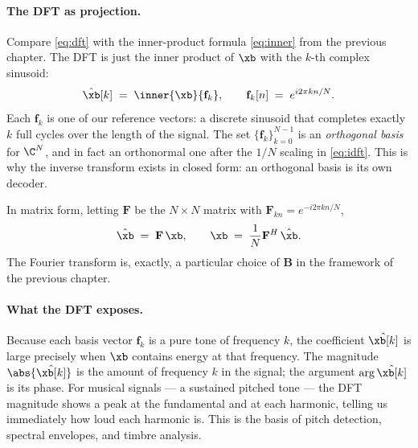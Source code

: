 
\paragraph{The DFT as projection.}  Compare \eqref{eq:dft} with the
inner-product formula \eqref{eq:inner} from the previous chapter.  The
DFT is just the inner product of $\xb$ with the $k$-th complex sinusoid:
\begin{equation}
    \hat{\xb}[k] \;=\; \inner{\xb}{\mathbf{f}_k},
    \qquad
    \mathbf{f}_k[n] \;=\; e^{i 2 \pi k n / N}.
    \label{eq:dft_as_inner}
\end{equation}
Each $\mathbf{f}_k$ is one of our reference vectors: a discrete sinusoid
that completes exactly $k$ full cycles over the length of the signal.
The set $\{\mathbf{f}_k\}_{k=0}^{N-1}$ is an \emph{orthogonal basis} for
$\C^N$, and in fact an orthonormal one after the $1/N$ scaling in
\eqref{eq:idft}.  This is why the inverse transform exists in closed
form: an orthogonal basis is its own decoder.

In matrix form, letting $\mathbf{F}$ be the $N \times N$ matrix with
$\mathbf{F}_{kn} = e^{-i 2 \pi k n / N}$,
\begin{equation}
    \hat\xb \;=\; \mathbf{F}\, \xb,
    \qquad
    \xb \;=\; \frac{1}{N} \mathbf{F}^H\, \hat\xb.
    \label{eq:dft_matrix}
\end{equation}
The Fourier transform is, exactly, a particular choice of
$\mathbf{B}$ in the framework of the previous chapter.

\paragraph{What the DFT exposes.}  Because each basis vector
$\mathbf{f}_k$ is a pure tone of frequency $k$, the coefficient
$\hat\xb[k]$ is large precisely when $\xb$ contains energy at that
frequency.  The magnitude $\abs{\hat\xb[k]}$ is the amount of frequency
$k$ in the signal; the argument $\arg \hat\xb[k]$ is its phase.  For
musical signals --- a sustained pitched tone --- the DFT magnitude
shows a peak at the fundamental and at each harmonic, telling us
immediately how loud each harmonic is.  This is the basis of pitch
detection, spectral envelopes, and timbre analysis.

